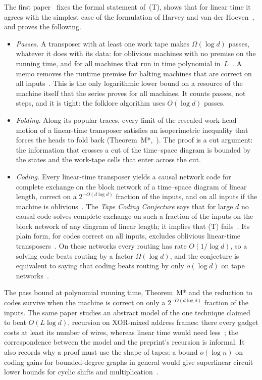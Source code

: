 The first paper~\cite{FirstPaper2026} fixes the formal statement of~(T), shows that for linear time it agrees with the
simplest case of the formulation of Harvey and van der Hoeven~\cite[Proposition~11.1, a written proof]{FirstPaper2026},
and proves the following.
\begin{itemize}[leftmargin=1.5em]
\item \emph{Passes.} A transposer with at least one work tape makes $\Omega(\log d)$ passes, whatever it does with its
data: for oblivious machines with no premise on the running time, and for all machines that run in time polynomial
in~$L$~\cite[Theorems~5.9 and~5.12]{FirstPaper2026}. A memo removes the runtime premise for halting machines that are
correct on all inputs~\cite{PassesMemo2026}. This is the only logarithmic lower bound on a resource of the machine itself
that the series proves for all machines. It counts passes, not steps, and it is tight: the folklore algorithm uses
$O(\log d)$ passes.
\item \emph{Folding.} Along its popular traces, every limit of the rescaled work-head motion of a linear-time
transposer satisfies an isoperimetric inequality that forces the heads to fold back
(Theorem~M*,~\cite[Theorems~7.8 and~7.9]{FirstPaper2026}). The proof is a cut argument: the information that crosses a
cut of the time--space diagram is bounded by the states and the work-tape cells that enter across the cut.
\item \emph{Coding.} Every linear-time transposer yields a causal network code for complete exchange on the block
network of a time--space diagram of linear length, correct on a $2^{-O(d\log d)}$ fraction of the inputs, and on all
inputs if the machine is oblivious~\cite[Theorems~8.10 and~9.9]{FirstPaper2026}. The \emph{Tape Coding Conjecture} says
that for large $d$ no causal code solves complete exchange on such a fraction of the inputs on the block network of any
diagram of linear length; it implies that (T) fails~\cite[Conjecture~9.1, Theorem~9.2]{FirstPaper2026}. Its plain form,
for codes correct on all inputs, excludes oblivious linear-time transposers~\cite[Theorem~9.9]{FirstPaper2026}. On
these networks every routing has rate $O(1/\log d)$, so a solving code beats routing by a factor $\Omega(\log d)$, and
the conjecture is equivalent to saying that coding beats routing by only $o(\log d)$ on tape
networks~\cite[Theorems~8.8 and~9.4]{FirstPaper2026}.
\end{itemize}
The pass bound at polynomial running time, Theorem~M* and the reduction to codes survive when the machine is correct
on only a $2^{-O(d\log d)}$ fraction of the inputs. The same paper studies an abstract model of the one technique claimed
to beat $O(L\log d)$, recursion on XOR-mixed address frames: there every gadget costs at least its number of wires,
whereas linear time would need less~\cite[Theorem~12.4 and Proposition~12.9]{FirstPaper2026}; the correspondence between
the model and the preprint's recursion is informal. It also records why a proof must use the shape of tapes: a bound
$o(\log n)$ on coding gains for bounded-degree graphs in general would give superlinear circuit lower bounds for cyclic
shifts and multiplication~\cite[Proposition~11.2]{FirstPaper2026}.

